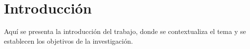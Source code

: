 \chapter{Introducción}

Aquí se presenta la introducción del trabajo, donde se contextualiza el tema y se establecen los objetivos de la investigación.